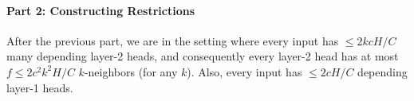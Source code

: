 \documentclass[11pt,a4paper]{article}
\begin{document}







\paragraph{Part 2: Constructing Restrictions}
After the previous part, we are in the setting where every input has $\leq 2kcH/C$ many depending layer-2 heads, and consequently every layer-2 head has at most $f \leq 2c^2k^2H/C$ $k$-neighbors (for any $k$).
Also, every input has $\leq 2cH/C$ depending layer-1 heads.
\end{document}
